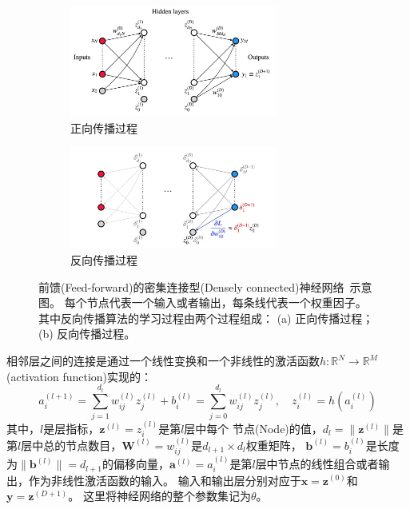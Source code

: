 \begin{figure}  
  \begin{center}
    \begin{subfigure}{.9\textwidth}
     \centering
    \includegraphics[width=0.75\textwidth]{figuresML/FP.jpg}
    \caption{正向传播过程}
    \end{subfigure}
    \begin{subfigure}{.9\textwidth}
     \centering
    \includegraphics[width=0.75\textwidth]{figuresML/BP.jpg}
    \caption{反向传播过程}
    \end{subfigure}
  \end{center}
  \caption{
前馈(Feed-forward)的密集连接型(Densely connected)神经网络~\cite{FDNN}示意图。
每个节点代表一个输入或者输出，每条线代表一个权重因子。
其中反向传播算法的学习过程由两个过程组成：
(a) 正向传播过程；(b) 反向传播过程。
  }
  \label{fig:BP}
\end{figure}

相邻层之间的连接是通过一个线性变换和一个非线性的激活函数$h:\mathbb{R}^N\rightarrow\mathbb{R}^M$(activation function)实现的：
\begin{equation} 
\label{eq:ml1}	
a_{i}^{(l+1)}=\sum_{j=1}^{d_l} w_{ij}^{(l)}z_{j}^{(l)} + b_{i}^{(l)} = \sum_{j=0}^{d_l} w_{ij}^{(l)}z_{j}^{(l)}, \quad z_{i}^{(l)}=h(a_{i}^{(l)})
\end{equation}
其中，$l$是层指标，$\boldsymbol{z}^{(l)}={z_{i}^{(l)}}$是第$l$层中每个
节点(Node)的值，$d_l=\|\boldsymbol{z}^{(l)}\|$是第$l$层中总的节点数目，$\boldsymbol{W}^{(l)}={w_{ij}^{(l)}}$是$d_{l+1} \times d_l$权重矩阵，
$\boldsymbol{b}^{(l)}={b_{i}^{(l)}}$是长度为$\|\boldsymbol{b}^{(l)}\|=d_{l+1}$的偏移向量，$\boldsymbol{a}^{(l)}={a_{i}^{(l)}}$是第$l$层中节点的线性组合或者输出，作为非线性激活函数的输入。
输入和输出层分别对应于$\boldsymbol{x}=\boldsymbol{z}^{(0)}$和$\boldsymbol{y}=\boldsymbol{z}^{(D+1)}$。
这里将神经网络的整个参数集记为$\theta$。

